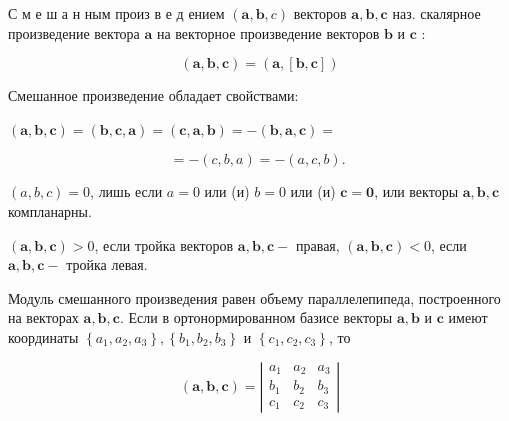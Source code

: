 \documentclass[10pt]{article}
\begin{document}
С м е ш а н ным произ в е д ением $(\boldsymbol{a}, \boldsymbol{b}, c)$ векторов $\boldsymbol{a}, \boldsymbol{b}, \boldsymbol{c}$ наз. скалярное произведение вектора $\boldsymbol{a}$ на векторное произведение векторов $\boldsymbol{b}$ и $\boldsymbol{c}$ :



\[

(\boldsymbol{a}, \boldsymbol{b}, \boldsymbol{c})=(\boldsymbol{a},[\boldsymbol{b}, \boldsymbol{c}])

\]



Смешанное произведение обладает свойствами:



$(\boldsymbol{a}, \boldsymbol{b}, \boldsymbol{c})=(\boldsymbol{b}, \boldsymbol{c}, \boldsymbol{a})=(\boldsymbol{c}, \boldsymbol{a}, \boldsymbol{b})=-(\boldsymbol{b}, \boldsymbol{a}, \boldsymbol{c})=$



\[

=-(c, b, a)=-(a, c, b) \text {. }

\]



$(a, b, c)=0$, лишь если $a=0$ или (и) $b=0$ или (и) $\boldsymbol{c}=\mathbf{0}$, или векторы $\boldsymbol{a}, \boldsymbol{b}, \boldsymbol{c}$ компланарны.



$(\boldsymbol{a}, \boldsymbol{b}, \boldsymbol{c})>0$, если тройка векторов $\boldsymbol{a}, \boldsymbol{b}, \boldsymbol{c}-$ правая, $(\boldsymbol{a}, \boldsymbol{b}, \boldsymbol{c})<0$, если $\boldsymbol{a}, \boldsymbol{b}, \boldsymbol{c}-$ тройка левая.



Модуль смешанного произведения равен объему параллелепипеда, построенного на векторах $\boldsymbol{a}, \boldsymbol{b}, \boldsymbol{c}$. Если в ортонормированном базисе векторы $\boldsymbol{a}, \boldsymbol{b}$ и $\boldsymbol{c}$ имеют координаты $\left\{a_{1}, a_{2}, a_{3}\right\},\left\{b_{1}, b_{2}, b_{3}\right\}$ и $\left\{c_{1}, c_{2}, c_{3}\right\}$, то



\[

(\boldsymbol{a}, \boldsymbol{b}, \boldsymbol{c})=\left|\begin{array}{lll}

a_{1} & a_{2} & a_{3} \\

b_{1} & b_{2} & b_{3} \\

c_{1} & c_{2} & c_{3}

\end{array}\right|

\]
\end{document}
